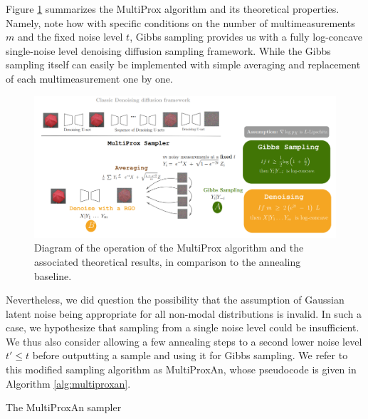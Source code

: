 Figure \ref{fig:multiprox} summarizes the MultiProx algorithm and its theoretical properties. Namely, note how with specific conditions on the number of multimeasurements $m$ and the fixed noise level $t$, Gibbs sampling provides us with a fully log-concave single-noise level denoising diffusion sampling framework. While the Gibbs sampling itself can easily be implemented with simple averaging and replacement of each multimeasurement one by one.

\begin{figure}[H]
    \centering
    \includegraphics[width=\textwidth]{figures/multiprox/diagram.png}
    \caption[MultiProx diagram.]{Diagram of the operation of the MultiProx algorithm and the associated theoretical results, in comparison to the annealing baseline.}
    \label{fig:multiprox}
\end{figure}

Nevertheless, we did question the possibility that the assumption of Gaussian latent noise being appropriate for all non-modal distributions is invalid. In such a case, we hypothesize that sampling from a single noise level could be insufficient. We thus also consider allowing a few annealing steps to a second lower noise level $t' \leq t$ before outputting a sample and using it for Gibbs sampling. We refer to this modified sampling algorithm as MultiProxAn, whose pseudocode is given in Algorithm \ref{alg:multiproxan}.

\begin{algorithm}[H]
    \caption{The MultiProxAn sampler}
    \label{alg:multiproxan}
    \begin{algorithmic}
        \ENDIF
        \ENDFOR
        \ENDFOR
    \end{algorithmic}
\end{algorithm}

